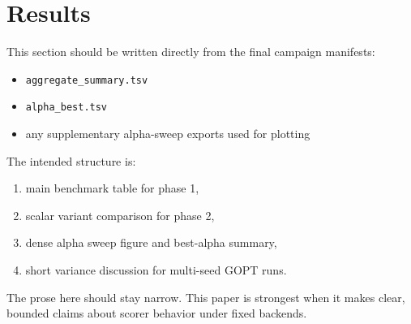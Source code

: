 \section{Results}

This section should be written directly from the final campaign manifests:

\begin{itemize}
  \item \texttt{aggregate\_summary.tsv}
  \item \texttt{alpha\_best.tsv}
  \item any supplementary alpha-sweep exports used for plotting
\end{itemize}

The intended structure is:

\begin{enumerate}
  \item main benchmark table for phase 1,
  \item scalar variant comparison for phase 2,
  \item dense alpha sweep figure and best-alpha summary,
  \item short variance discussion for multi-seed GOPT runs.
\end{enumerate}

The prose here should stay narrow. This paper is strongest when it makes clear,
bounded claims about scorer behavior under fixed backends.
